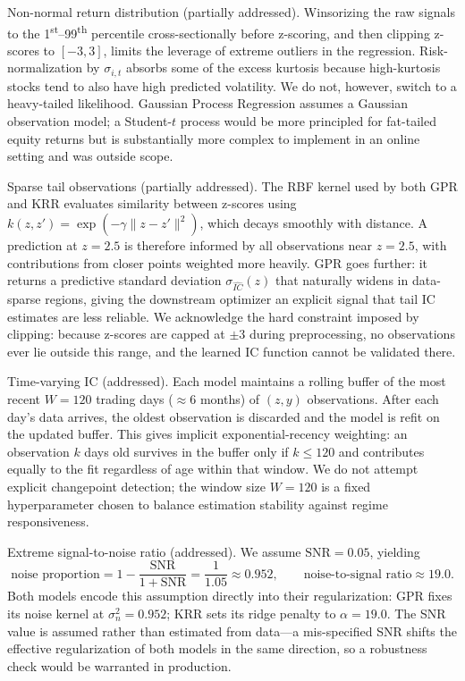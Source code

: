\documentclass[11pt]{amsart}
\begin{document}
Non-normal return distribution (partially addressed).\n
Winsorizing the raw signals to the 1\textsuperscript{st}--99\textsuperscript{th}
percentile cross-sectionally before z-scoring, and then clipping z-scores
to $[-3, 3]$, limits the leverage of extreme outliers in the
regression.  Risk-normalization by $\sigma_{i,t}$ absorbs some of the
excess kurtosis because high-kurtosis stocks tend to also have high
predicted volatility.  We do not, however, switch to a heavy-tailed
likelihood.  Gaussian Process Regression assumes a Gaussian observation
model; a Student-$t$ process would be more principled for fat-tailed equity
returns but is substantially more complex to implement in an online setting
and was outside scope.

Sparse tail observations (partially addressed).\n
The RBF kernel used by both GPR and KRR evaluates similarity between
z-scores using $k(z, z') = \exp(-\gamma\|z - z'\|^2)$, which decays
smoothly with distance.  A prediction at $z = 2.5$ is therefore informed by
all observations near $z = 2.5$, with contributions from closer points
weighted more heavily.  GPR goes further: it returns a predictive standard
deviation $\sigma_{\widehat{IC}}(z)$ that naturally widens in data-sparse
regions, giving the downstream optimizer an explicit signal that tail
IC estimates are less reliable.  We acknowledge the hard constraint imposed
by clipping: because z-scores are capped at $\pm 3$ during preprocessing,
no observations ever lie outside this range, and the learned IC function
cannot be validated there.

Time-varying IC (addressed).
Each model maintains a rolling buffer of the most recent $W = 120$ trading
days ($\approx 6$ months) of $(z, y)$ observations.  After each day's data
arrives, the oldest observation is discarded and the model is refit on the
updated buffer.  This gives implicit exponential-recency weighting: an
observation $k$ days old survives in the buffer only if $k \leq 120$ and
contributes equally to the fit regardless of age within that window.  We do
not attempt explicit changepoint detection; the window size $W = 120$ is a
fixed hyperparameter chosen to balance estimation stability against regime
responsiveness.

Extreme signal-to-noise ratio (addressed).\n
We assume $\mathrm{SNR} = 0.05$, yielding
\[
  \text{noise proportion} = 1 - \frac{\mathrm{SNR}}{1+\mathrm{SNR}}
    = \frac{1}{1.05} \approx 0.952,
  \qquad
  \text{noise-to-signal ratio} \approx 19.0.
\]
Both models encode this assumption directly into their regularization:
GPR fixes its noise kernel at $\sigma_n^2 = 0.952$; KRR sets its ridge
penalty to $\alpha = 19.0$.  The SNR value is assumed rather than estimated
from data---a mis-specified SNR shifts the effective regularization of both
models in the same direction, so a robustness check would be warranted in
production.
\end{document}
